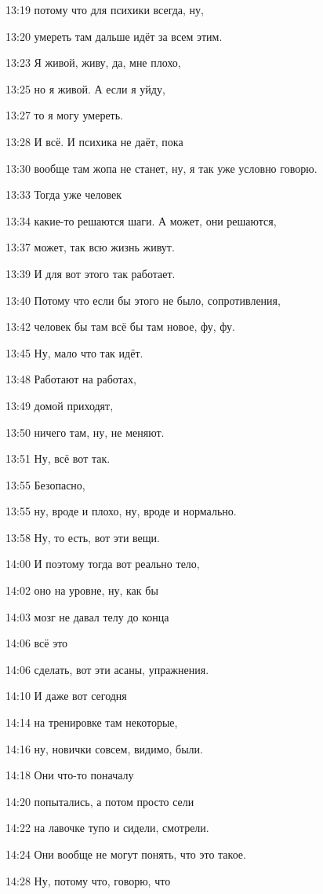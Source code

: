 13:19
потому что для психики всегда, ну,

13:20
умереть там дальше идёт за всем этим.

13:23
Я живой, живу, да, мне плохо,

13:25
но я живой. А если я уйду,

13:27
то я могу умереть.

13:28
И всё. И психика не даёт, пока

13:30
вообще там жопа не станет, ну, я так уже условно говорю.

13:33
Тогда уже человек

13:34
какие-то решаются шаги. А может, они решаются,

13:37
может, так всю жизнь живут.

13:39
И для вот этого так работает.

13:40
Потому что если бы этого не было, сопротивления,

13:42
человек бы там всё бы там новое, фу, фу.

13:45
Ну, мало что так идёт.

13:48
Работают на работах,

13:49
домой приходят,

13:50
ничего там, ну, не меняют.

13:51
Ну, всё вот так.

13:55
Безопасно,

13:55
ну, вроде и плохо, ну, вроде и нормально.

13:58
Ну, то есть, вот эти вещи.

14:00
И поэтому тогда вот реально тело,

14:02
оно на уровне, ну, как бы

14:03
мозг не давал телу до конца

14:06
всё это

14:06
сделать, вот эти асаны, упражнения.

14:10
И даже вот сегодня

14:14
на тренировке там некоторые,

14:16
ну, новички совсем, видимо, были.

14:18
Они что-то поначалу

14:20
попытались, а потом просто сели

14:22
на лавочке тупо и сидели, смотрели.

14:24
Они вообще не могут понять, что это такое.

14:28
Ну, потому что, говорю, что

